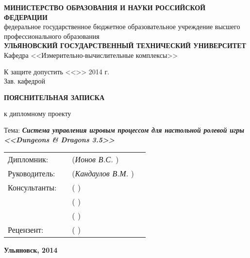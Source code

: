 \begin{titlepage}

\sffamily


\small
\begin{center}

\MakeTextUppercase{\textbf{министерство образования и науки российской федерации}}\\
федеральное государственное бюджетное образовательное учреждение высшего профессионального образования\\
\MakeTextUppercase{\textbf{ульяновский государственный технический университет}}\\[0.7cm]

Кафедра <<Измерительно-вычислительные комплексы>>\\[0.7cm]

\begin{flushright}

К защите допустить <<\underline{\hspace{1cm}}>>\underline{\hspace{2.5cm}} 2014 г.\\
Зав. кафедрой \underline{\hspace{3.5cm}}

\end{flushright}

\vspace{1.5cm}

\LARGE

\textbf{ПОЯСНИТЕЛЬНАЯ ЗАПИСКА}

\Large

к дипломному проекту\\[0.7cm]

\normalsize

Тема: \textbf{\textit{\emph{Система управления игровым процессом для настольной ролевой игры <<Dungeons \& Dragons 3.5>>}}}

\vspace{2cm}

\begin{tabular}{l m{6cm} m{5cm} l}
    Дипломник:    & \emph{\hfill} & (\emph{Ионов В.С.\hfill}     )  & \\[0.5cm]
    Руководитель: & \emph{\hfill} & (\emph{Кандаулов В.М.\hfill} )  & \\[0.5cm]
    Консультанты: & \emph{\hfill} & (\emph{\hfill}               )  & \\[0.5cm]
                  & \emph{\hfill} & (\emph{\hfill}               )  & \\[0.5cm]
                  & \emph{\hfill} & (\emph{\hfill}               )  & \\[0.5cm]
    Рецензент:    & \emph{\hfill} & (\emph{\hfill}               )  & \\
\end{tabular}

\vfill

\textbf{Ульяновск, 2014}

\end{center}

\end{titlepage}

\restoregeometry
